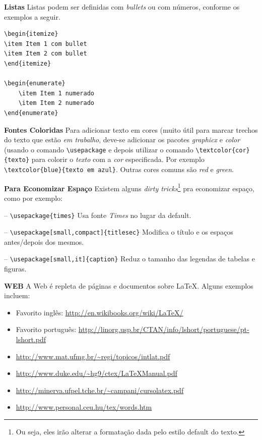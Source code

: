 \begin{anexosenv}
\textbf{Listas} Listas podem ser definidas com \textit{bullets} ou com números, conforme os exemplos a seguir.

\begin{verbatim}
\begin{itemize}
\item Item 1 com bullet 
\item Item 2 com bullet 
\end{itemize}

\begin{enumerate}
	\item Item 1 numerado
	\item Item 2 numerado
\end{enumerate}
\end{verbatim}

\textbf{Fontes Coloridas} Para adicionar texto em cores (muito útil para marcar trechos do texto que estão \textit{em trabalho}, deve-se adicionar os pacotes \textit{graphicx} e \textit{color} (usando o comando \verb|\usepackage| e depois utilizar o comando \verb|\textcolor{cor}{texto}| para colorir o \textit{texto} com a \textit{cor} especificada. Por exemplo \verb|\textcolor{blue}{texto em azul}|. Outras cores comuns são \textit{red} e \textit{green}.

\textbf{Para Economizar Espaço} Existem alguns \textit{dirty tricks}\footnote{Ou seja, eles irão alterar a formatação dada pelo estilo default do texto.} pra economizar espaço, como por exemplo:

-- \verb|\usepackage{times}| Usa fonte \textit{Times} no lugar da default.

-- \verb|\usepackage[small,compact]{titlesec}| Modifica o título e os espaços antes/depois dos mesmos.

-- \verb|\usepackage[small,it]{caption}| Reduz o tamanho das legendas de tabelas e figuras.

\textbf{WEB} A Web é repleta de páginas e documentos sobre LaTeX. Alguns exemplos incluem:

\begin{itemize}\addtolength{\itemsep}{-0.5\baselineskip}
  \item Favorito inglês: \url{http://en.wikibooks.org/wiki/LaTeX/}
  \item Favorito português: \url{http://linorg.usp.br/CTAN/info/lshort/portuguese/pt-lshort.pdf}
  \item \url{http://www.mat.ufmg.br/~regi/topicos/intlat.pdf}
  \item \url{http://www.duke.edu/~hg9/ctex/LaTeXManual.pdf}
  \item \url{http://minerva.ufpel.tche.br/~campani/cursolatex.pdf}
	\item \url{http://www.personal.ceu.hu/tex/words.htm}
\end{itemize}


\end{anexosenv}
